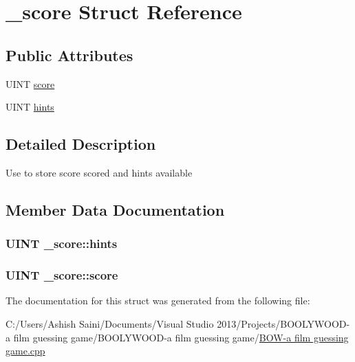\hypertarget{struct__score}{}\section{\+\_\+score Struct Reference}
\label{struct__score}
\subsection*{Public Attributes}
\begin{DoxyCompactItemize}
\item 
U\+I\+N\+T \hyperlink{struct__score_ae3955df353b75f03127b588e355e49b1}{score}
\item 
U\+I\+N\+T \hyperlink{struct__score_a988a9544043e66b67c1ef025b898b202}{hints}
\end{DoxyCompactItemize}


\subsection{Detailed Description}
Use to store score scored and hints available 

\subsection{Member Data Documentation}
\hypertarget{struct__score_a988a9544043e66b67c1ef025b898b202}{}
\subsubsection[{hints}]{\setlength{\rightskip}{0pt plus 5cm}U\+I\+N\+T \+\_\+score\+::hints}\label{struct__score_a988a9544043e66b67c1ef025b898b202}
\hypertarget{struct__score_ae3955df353b75f03127b588e355e49b1}{}
\subsubsection[{score}]{\setlength{\rightskip}{0pt plus 5cm}U\+I\+N\+T \+\_\+score\+::score}\label{struct__score_ae3955df353b75f03127b588e355e49b1}


The documentation for this struct was generated from the following file\+:\begin{DoxyCompactItemize}
\item 
C\+:/\+Users/\+Ashish Saini/\+Documents/\+Visual Studio 2013/\+Projects/\+B\+O\+O\+L\+Y\+W\+O\+O\+D-\/a film guessing game/\+B\+O\+O\+L\+Y\+W\+O\+O\+D-\/a film guessing game/\hyperlink{_b_o_w-a_01film_01guessing_01game_8cpp}{B\+O\+W-\/a film guessing game.\+cpp}\end{DoxyCompactItemize}

